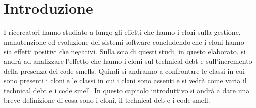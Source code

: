 \chapter{Introduzione}
I ricercatori hanno studiato a lungo gli effetti che hanno i cloni sulla gestione, manutenzione ed evoluzione dei sistemi software concludendo che i cloni hanno sia effetti positivi che negativi. Sulla scia di questi studi, in questo elaborato, si andrà ad analizzare l'effetto che hanno i cloni sul technical debt e sull'incremento della presenza dei code smells. Quindi si andranno a confrontare le classi in cui sono presenti i cloni e le classi in cui i cloni sono assenti e si vedrà come varia il technical debt e i code smell. In questo capitolo introduttivo si andrà a dare una breve definizione di cosa sono i cloni, il technical deb e i code smell.


